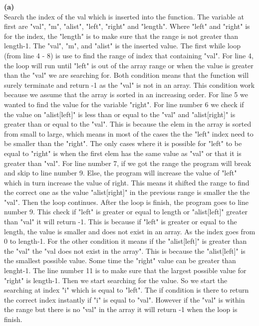\documentclass[a4paper, 11pt]{article}
\renewcommand{\part}[1] {\vspace{.10in} {\bf (#1)}}
\begin{document}
\part{a}\\
Search the index of the val which is inserted into the function. The variable at first are "val", "m", "alist", "left", "right" and "length". Where "left" and "right" is for the index, the "length" is to make sure that the range is not greater than length-1. The "val", "m", and "alist" is the inserted value. The first while loop (from line 4 - 8) is use to find the range of index that containing "val". For line 4, the loop will run until "left" is out of the array range or when the value is greater than the "val" we are searching for. Both condition means that the function will surely terminate and return -1 as the "val" is not in an array. This condition work because we assume that the array is sorted in an increasing order. For line 5 we wanted to find the value for the variable "right". For line number 6 we check if the value on "alist[left]" is less than or equal to the "val" and "alist[right]" is greater than or equal to the "val". This is because the elem in the array is sorted from small to large, which means in most of the cases the the "left" index need to be smaller than the "right". The only cases where it is possible for "left" to be equal to "right" is when the first elem has the same value as "val" or that it is greater than "val". For line number 7, if we got the range the program will break and skip to line number 9. Else, the program will increase the value of "left" which in turn increase the value of right. This means it shifted the range to find the correct one as the value "alist[right]" in the previous range is smaller the the "val". Then the loop continues. After the loop is finish, the program goes to line number 9. This check if "left" is greater or equal to length or "alist[left]" greater than "val" it will return -1. This is because if "left" is greater or equal to the length, the value is smaller and does not exist in an array. As the index goes from 0 to length-1. For the other condition it means if the "alist[left]" is greater than the "val" the "val does not exist in the array". This is because the "alist[left]" is the smallest possible value. Some time the "right" value can be greater than lenght-1. The line number 11 is to make sure that the largest possible value for "right" is length-1. Then we start searching for the value. So we start the searching at index "i" which is equal to "left". The if condition is there to return the correct index instantly if "i" is equal to "val". However if the "val" is within the range but there is no "val" in the array it will return -1 when the loop is finish.
\end{document}
